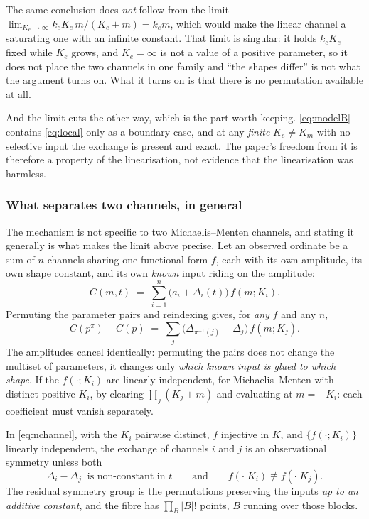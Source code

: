 The same conclusion does \emph{not} follow from the limit
$\lim_{K_e \to \infty} k_e K_e\, m/(K_e+m) = k_e m$, which would make the linear channel a
saturating one with an infinite constant. That limit is singular: it holds $k_e K_e$ fixed
while $K_e$ grows, and
$K_e = \infty$ is not a value of a positive parameter, so it does not place the two channels
in one family and ``the shapes differ'' is not what the argument turns on. What it turns on
is that there is no permutation available at all.

And the limit cuts the other way, which is the part worth keeping.
\eqref{eq:modelB} contains \eqref{eq:local} only as a boundary case, and at any
\emph{finite} $K_e \neq K_m$ with no selective input the exchange is present and exact.
The paper's freedom from it is therefore a property of the linearisation, not
evidence that the linearisation was harmless.

\subsubsection{What separates two channels, in general}
\label{sec:exchange}

The mechanism is not specific to two Michaelis--Menten channels, and stating it generally
is what makes the limit above precise. Let an observed ordinate be a sum of $n$ channels
sharing one functional form $f$, each with its own amplitude, its own shape constant, and
its own \emph{known} input riding on the amplitude:
\begin{equation}
C(m,t) \;=\; \sum_{i=1}^{n} \bigl(a_i + \Delta_i(t) \bigr)\, f(m; K_i).
\label{eq:nchannel}
\end{equation}
Permuting the parameter pairs and reindexing gives, for \emph{any} $f$ and any $n$,
\begin{equation}
C(p^\pi) - C(p) \;=\; \sum_j \bigl(\Delta_{\pi^{-1}(j)} - \Delta_j \bigr)\, f(m; K_j).
\label{eq:permdiff}
\end{equation}
The amplitudes cancel identically: permuting the pairs does not change the multiset of
parameters, it changes only \emph{which known input is glued to which shape}. If the
$f(\cdot;K_i)$ are linearly independent, for Michaelis--Menten with distinct positive
$K_i$, by clearing $\prod_j(K_j+m)$ and evaluating at $m = -K_i$: each coefficient must
vanish separately.

\begin{proposition}
\label{prop:exchange}
In \eqref{eq:nchannel}, with the $K_i$ pairwise distinct, $f$ injective in $K$, and
$\{f(\cdot;K_i)\}$ linearly independent, the exchange of channels $i$ and $j$ is an
observational symmetry unless both
\begin{equation}
\Delta_i - \Delta_j \ \text{ is non-constant in } t
\qquad\text{and}\qquad
f(\cdot\;K_i) \not\equiv f(\cdot\;K_j).
\label{eq:twofactors}
\end{equation}
The residual symmetry group is the permutations preserving the inputs \emph{up to an
additive constant}, and the fibre has $\prod_B |B|!$ points, $B$ running over those blocks.
\end{proposition}

